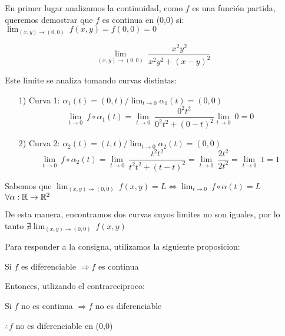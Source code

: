 \begin{solution}
   En primer lugar analizamos la continuidad, como $f$ es una función partida, queremos demostrar que $f$ es continua en (0,0) si:  $\lim_{(x,y)\to(0,0)} \ f(x,y) = f(0,0)=0$
   
    \[
        \lim_{(x,y)\to(0,0)} \
         \frac{x^2y^2}{x^2y^2+(x-y)^2}
    \]

    Este limite se analiza tomando curvas distintas:

\begin{itemize}
    \item[1)] Curva 1: $\alpha_1(t)=(0,t) / \lim_{t\to0} \alpha_1(t) = (0,0)$
    \[
         \lim_{t\to0} \
          f\circ\alpha_1(t)=\lim_{t\to0} \
         \frac{0^2t^2}{0^2t^2+(0-t)^2}\lim_{t\to0} \
          0=0
    \]

     \item[2)]  Curva 2: $\alpha_2(t)=(t,t) / \lim_{t\to0} \alpha_2(t) = (0,0)$
     \[
         \lim_{t\to0} \
          f\circ\alpha_2(t)=\lim_{t\to0} \
         \frac{t^2t^2}{t^2t^2+(t-t)^2}=\lim_{t\to0} \
         \frac{2t^2}{2t^2}=\lim_{t\to0} \
         1=1
    \]
\end{itemize}
Sabemos que $\lim_{(x,y)\to(0,0)} \ f(x,y) = L \iff \lim_{t\to0} \ f\circ\alpha(t)=L  $          $ \forall\alpha:\mathbb{R}\rightarrow\mathbb{R}^2  $ 

   
De esta manera, encontramos dos curvas cuyos limites no son iguales, por lo tanto $\nexists \lim_{(x,y)\to(0,0)} \ f(x,y)$

Para responder a la consigna, utilizamos la siguiente proposicion:
 \begin{center} Si $f$ es diferenciable $\Rightarrow f$ es continua \end{center}

 Entonces, utlizando el contrareciproco: 
\begin{center}Si $f$ no es continua $\Rightarrow f$ no es diferenciable \end{center}

$\therefore f $ no es diferenciable en (0,0)
 
\end{solution}



